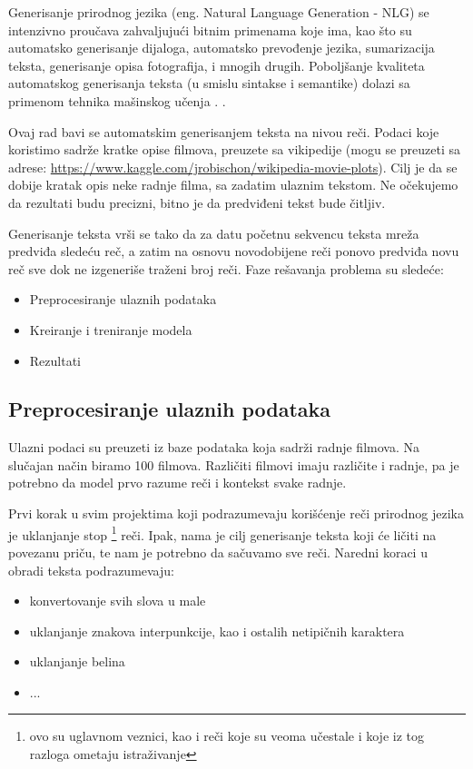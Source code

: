 \documentclass[a4paper]{article}
\begin{document}
Generisanje prirodnog jezika (eng. Natural Language Generation - NLG) se intenzivno proučava zahvaljujući bitnim primenama koje ima, kao što su automatsko generisanje dijaloga, automatsko prevođenje jezika, sumarizacija teksta, generisanje opisa fotografija, i mnogih drugih. Poboljšanje kvaliteta automatskog generisanja teksta (u smislu sintakse i semantike) dolazi sa primenom tehnika mašinskog učenja \cite{wang2018automatic}. .

Ovaj rad bavi se automatskim generisanjem teksta na nivou reči. Podaci koje koristimo sadrže kratke opise filmova, preuzete sa vikipedije (mogu se preuzeti sa adrese: \url{https://www.kaggle.com/jrobischon/wikipedia-movie-plots}). Cilj je da se dobije kratak opis neke radnje filma, sa zadatim ulaznim tekstom. Ne očekujemo da rezultati budu precizni, bitno je da predviđeni tekst bude čitljiv.

Generisanje teksta vrši se tako da za datu početnu sekvencu teksta mreža predviđa sledeću reč, a zatim na osnovu novodobijene reči ponovo predviđa novu reč sve dok ne izgeneriše traženi broj reči. Faze rešavanja problema su sledeće:
\begin{itemize}
    \item Preprocesiranje ulaznih podataka
    \item Kreiranje i treniranje modela
    \item Rezultati
\end{itemize}


\subsection{Preprocesiranje ulaznih podataka}

Ulazni podaci su preuzeti iz baze podataka koja sadrži radnje filmova. Na slučajan način biramo 100 filmova. Različiti filmovi imaju različite i radnje, pa je potrebno da model prvo razume reči i kontekst svake radnje.

Prvi korak u svim projektima koji podrazumevaju korišćenje reči prirodnog jezika je uklanjanje stop \footnote{ovo su uglavnom veznici, kao i reči koje su veoma učestale i koje iz tog razloga ometaju istraživanje} reči. Ipak, nama je cilj generisanje teksta koji će ličiti na povezanu priču, te nam je potrebno da sačuvamo sve reči. Naredni koraci u obradi teksta podrazumevaju:
\begin{itemize}
    \item konvertovanje svih slova u male
    \item uklanjanje znakova interpunkcije, kao i ostalih netipičnih karaktera
    \item uklanjanje belina
    \item ...
\end{itemize}
\end{document}
